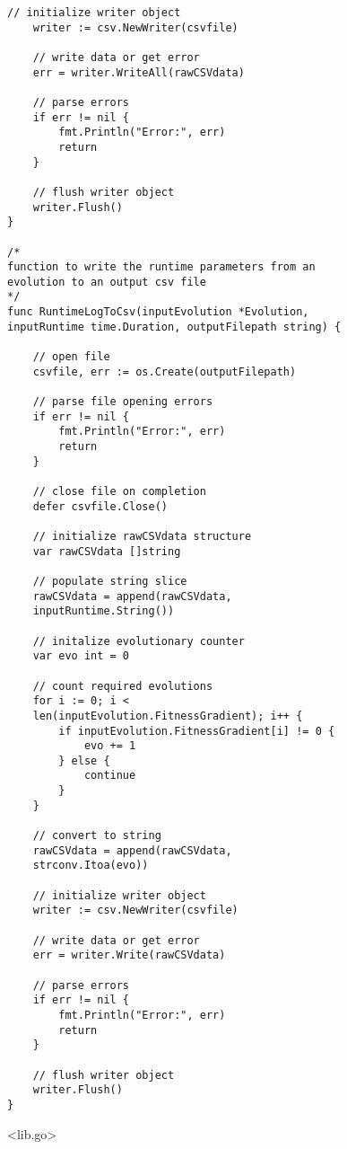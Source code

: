\begin{lstlisting}[basicstyle=\small]
	// initialize writer object
	writer := csv.NewWriter(csvfile)

	// write data or get error
	err = writer.WriteAll(rawCSVdata)

	// parse errors
	if err != nil {
		fmt.Println("Error:", err)
		return
	}

	// flush writer object
	writer.Flush()
}

/*
function to write the runtime parameters from an 
evolution to an output csv file
*/
func RuntimeLogToCsv(inputEvolution *Evolution, 
inputRuntime time.Duration, outputFilepath string) {

	// open file
	csvfile, err := os.Create(outputFilepath)

	// parse file opening errors
	if err != nil {
		fmt.Println("Error:", err)
		return
	}

	// close file on completion
	defer csvfile.Close()

	// initialize rawCSVdata structure
	var rawCSVdata []string

	// populate string slice
	rawCSVdata = append(rawCSVdata, 
	inputRuntime.String())

	// initalize evolutionary counter
	var evo int = 0

	// count required evolutions
	for i := 0; i < 
	len(inputEvolution.FitnessGradient); i++ {
		if inputEvolution.FitnessGradient[i] != 0 {
			evo += 1
		} else {
			continue
		}
	}

	// convert to string
	rawCSVdata = append(rawCSVdata, 
	strconv.Itoa(evo))

	// initialize writer object
	writer := csv.NewWriter(csvfile)

	// write data or get error
	err = writer.Write(rawCSVdata)

	// parse errors
	if err != nil {
		fmt.Println("Error:", err)
		return
	}

	// flush writer object
	writer.Flush()
}

\end{lstlisting}

\newpage

<lib.go>

